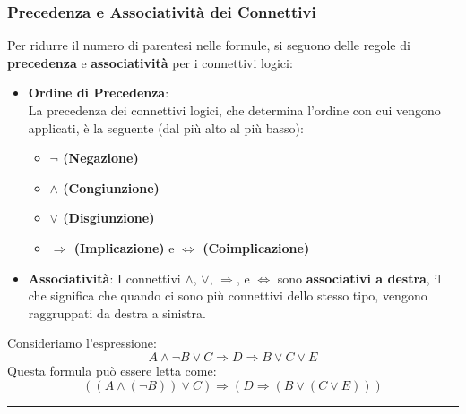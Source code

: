 \documentclass[
  a4paper,
]{article}
\providecommand{\tightlist}{%
  \setlength{\itemsep}{0pt}\setlength{\parskip}{0pt}}
\begin{document}
\hypertarget{precedenza-e-associativituxe0-dei-connettivi}{%
\subsubsection{Precedenza e Associatività dei
Connettivi}\label{precedenza-e-associativituxe0-dei-connettivi}}

Per ridurre il numero di parentesi nelle formule, si seguono delle
regole di \textbf{precedenza} e \textbf{associatività} per i connettivi
logici:

\begin{itemize}
\tightlist
\item
  \textbf{Ordine di Precedenza}:\\
  La precedenza dei connettivi logici, che determina l'ordine con cui
  vengono applicati, è la seguente (dal più alto al più basso):

  \begin{itemize}
  \tightlist
  \item
    \textbf{\(\neg\) (Negazione)}\\
  \item
    \textbf{\(\land\) (Congiunzione)}\\
  \item
    \textbf{\(\lor\) (Disgiunzione)}\\
  \item
    \textbf{\(\Rightarrow\) (Implicazione)} e \textbf{\(\iff\)
    (Coimplicazione)}
  \end{itemize}
\item
  \textbf{Associatività}: I connettivi \(\land\), \(\lor\),
  \(\Rightarrow\), e \(\iff\) sono \textbf{associativi a destra}, il che
  significa che quando ci sono più connettivi dello stesso tipo, vengono
  raggruppati da destra a sinistra.
\end{itemize}

\begin{examplebox}[Esempio]

Consideriamo l'espressione: \[
    A \land \neg B \lor C \Rightarrow D \Rightarrow B \lor C \lor E
    \] Questa formula può essere letta come:\\
\[((A \land (\neg B)) \lor C) \Rightarrow (D \Rightarrow (B \lor (C \lor E)))\]

\end{examplebox}

\par\noindent\rule{\linewidth}{0.4pt}\par\vspace{6pt}
\end{document}
